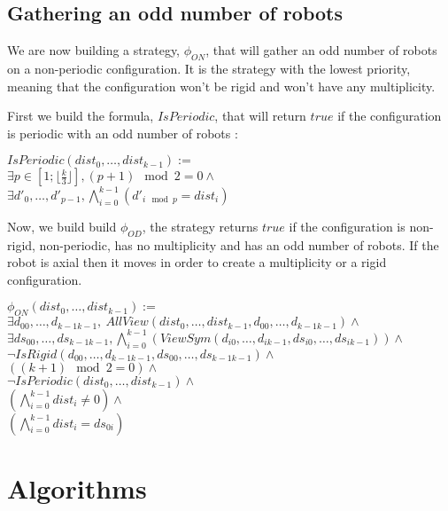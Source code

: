 \documentclass{article}
\begin{document}
\subsection{Gathering an odd number of robots}

We are now building a strategy, $\phi_{ON}$, that will gather an odd number of robots on a non-periodic configuration. It is the strategy with the lowest priority, meaning that the configuration won't be rigid and won't have any multiplicity.

First we build the formula, $IsPeriodic$, that will return $true$ if the configuration is periodic with an odd number of robots :

\begin{center}
    
$IsPeriodic(dist_{0}, \ldots , dist_{k-1}):=$\\
$\exists p \in [1; \lfloor \frac{k}{3} \rfloor ], (p+1) \mod{2} = 0 \land $\\
$\exists d'_{0}, \ldots , d'_{p-1}, \bigwedge_{i=0}^{k-1} (d'_{i\mod{p}} = dist_{i})$
\end{center}

Now, we build build $\phi_{OD}$, the strategy returns $true$ if the configuration is non-rigid, non-periodic, has no multiplicity and has an odd number of robots. If the robot is axial then it moves in order to create a multiplicity or a rigid configuration.

\begin{center}
    
$\phi_{ON}(dist_{0}, \ldots , dist_{k-1}):=$\\
$\exists d_{00}, \ldots ,d_{k-1k-1},\ AllView(dist_{0}, \ldots ,dist_{k-1}, d_{00}, \ldots ,d_{k-1k-1})\land$\\
$\exists ds_{00}, \ldots ,ds_{k-1k-1}, \bigwedge_{i=0}^{k-1} (ViewSym(d_{i0}, \ldots , d_{ik-1}, ds_{i0}, \ldots , ds_{ik-1}))\land$\\
$\lnot IsRigid(d_{00}, \ldots ,d_{k-1k-1}, ds_{00}, \ldots ,ds_{k-1k-1}) \land $\\
$((k+1) \mod{2} = 0) \land $\\
$\lnot IsPeriodic(dist_{0}, \ldots , dist_{k-1}) \land $\\
$(\bigwedge_{i=0}^{k-1} dist_{i} \not= 0) \land $\\
$(\bigwedge_{i=0}^{k-1} dist_{i} = ds_{0i})$
\end{center}

\section{Algorithms}
\end{document}
